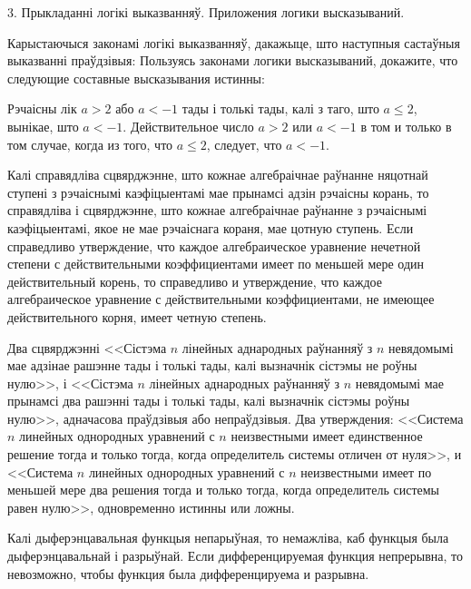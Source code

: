 



\biLangHeader
{3. Прыкладанні логікі выказванняў.}
{Приложения логики высказываний.}

\begin{problemList}
	
\problemItemSimple
{Карыстаючыся законамі логікі выказванняў, дакажыце, што наступныя састаўныя выказванні праўдзівыя:}
{Пользуясь законами логики высказываний, докажите, что следующие составные высказывания истинны:}

\begin{belarusianEnumerate}
	
\problemItemSimple
{Рэчаісны лік $a > 2$ або $a < -1$ тады і толькі тады, калі з таго, што $a \le 2$, вынікае, што $a < -1$.}
{Действительное число $a > 2$ или $a < -1$ в том и только в том случае, когда из того, что $a \le 2$, следует, что $a < -1$.}

\problemItemSimple
{Калі справядліва сцвярджэнне, што кожнае алгебраічнае раўнанне няцотнай ступені з рэчаіснымі каэфіцыентамі мае прынамсі адзін рэчаісны корань, то справядліва і сцвярджэнне, што кожнае алгебраічнае раўнанне з рэчаіснымі каэфіцыентамі, якое не мае рэчаіснага кораня, мае цотную ступень.}
{Если справедливо утверждение, что каждое алгебраическое уравнение нечетной степени с действительными коэффициентами имеет по меньшей мере один действительный корень, то справедливо и утверждение, что каждое алгебраическое уравнение с действительными коэффициентами, не имеющее действительного корня, имеет четную степень.}

\problemItemSimple
{Два сцвярджэнні <<Сістэма $n$ лінейных аднародных раўнанняў з $n$ невядомымі мае адзінае рашэнне тады і толькі тады, калі вызначнік сістэмы не роўны нулю>>, і <<Сістэма $n$ лінейных аднародных раўнанняў з $n$ невядомымі мае прынамсі два рашэнні тады і толькі тады, калі вызначнік сістэмы роўны нулю>>, адначасова праўдзівыя або непраўдзівыя.}
{Два утверждения: <<Система $n$ линейных однородных уравнений с $n$ неизвестными имеет единственное решение тогда и только тогда, когда определитель системы отличен от нуля>>, и <<Система $n$ линейных однородных уравнений с $n$ неизвестными имеет по меньшей мере два решения тогда и только тогда, когда определитель системы равен нулю>>, одновременно истинны или ложны.}

\problemItemSimple
{Калі дыферэнцавальная функцыя непарыўная, то немажліва, каб функцыя была дыферэнцавальнай і разрыўнай.}
{Если дифференцируемая функция непрерывна, то невозможно, чтобы функция была дифференцируема и разрывна.}


\end{belarusianEnumerate}
\end{problemList}
